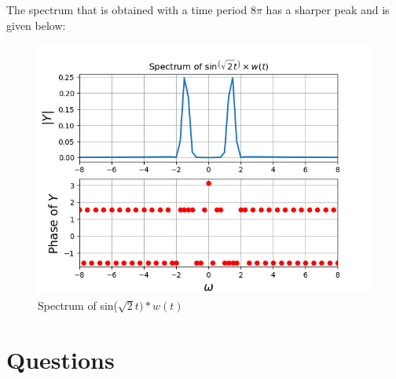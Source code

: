 \documentclass[11pt, a4paper]{article}
\begin{document}
The spectrum that is obtained with a time period $8\pi$ has a sharper peak and is given below:
\begin{figure}[h!]
\centering
\includegraphics[scale=0.6]{fig6.png}
\caption{Spectrum of sin($\sqrt{2}t)*w(t)$}
\label{fig:universe}
\end{figure}
 
\section{Questions}
\end{document}
